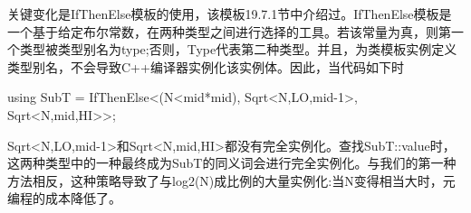 关键变化是IfThenElse模板的使用，该模板19.7.1节中介绍过。IfThenElse模板是一个基于给定布尔常数，在两种类型之间进行选择的工具。若该常量为真，则第一个类型被类型别名为type;否则，Type代表第二种类型。并且，为类模板实例定义类型别名，不会导致C++编译器实例化该实例体。因此，当代码如下时

\begin{cpp}
using SubT = IfThenElse<(N<mid*mid),
						Sqrt<N,LO,mid-1>,
						Sqrt<N,mid,HI>>;
\end{cpp}

Sqrt<N,LO,mid-1>和Sqrt<N,mid,HI>都没有完全实例化。查找SubT::value时，这两种类型中的一种最终成为SubT的同义词会进行完全实例化。与我们的第一种方法相反，这种策略导致了与log2(N)成比例的大量实例化:当N变得相当大时，元编程的成本降低了。















